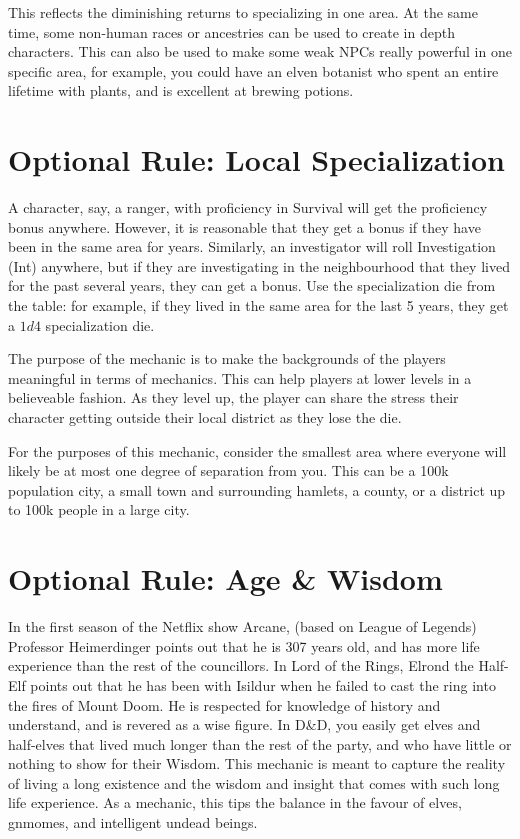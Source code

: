 \documentclass[twocolumn]{dndbook}
\begin{document}
This reflects the diminishing returns to specializing in one area.
At the same time, some non-human races or ancestries can be used to create in depth characters.
This can also be used to make some weak NPCs really powerful in one specific area,
for example, you could have an elven botanist who spent an entire lifetime with plants, and is excellent at brewing potions.\par



\section{Optional Rule: Local Specialization}

A character, say, a ranger, with proficiency in Survival will get the proficiency bonus anywhere.
However, it is reasonable that they get a bonus if they have been in the same area for years.
Similarly, an investigator will roll Investigation (Int) anywhere, but if they are investigating in the neighbourhood that they lived for the past several years, they can get a bonus.
Use the specialization die from the table: for example, if they lived in the same area for the last 5 years, they get a $1d4$ specialization die.\par

The purpose of the mechanic is to make the backgrounds of the players meaningful in terms of mechanics.
This can help players at lower levels in a believeable fashion. As they level up, the player can share the stress their character getting outside their local district as they lose the die.\par

For the purposes of this mechanic, consider the smallest area where everyone will likely be at most one degree of separation from you.
This can be a 100k population city, a small town and surrounding hamlets, a county, or a district up to 100k people in a large city.\par

\section{Optional Rule: Age \& Wisdom}

In the first season of the Netflix show Arcane, (based on League of Legends) Professor Heimerdinger points out that he is 307 years old, and has more life experience than the rest of the councillors.
In Lord of the Rings, Elrond the Half-Elf points out that he has been with Isildur when he failed to cast the ring into the fires of Mount Doom. He is respected for knowledge of history and understand, and is revered as a wise figure.
In D\&D, you easily get elves and half-elves that lived much longer than the rest of the party, and who have little or nothing to show for their Wisdom.
This mechanic is meant to capture the reality of living a long existence and the wisdom and insight that comes with such long life experience.
As a mechanic, this tips the balance in the favour of elves, gnmomes, and intelligent undead beings.\par
\end{document}
